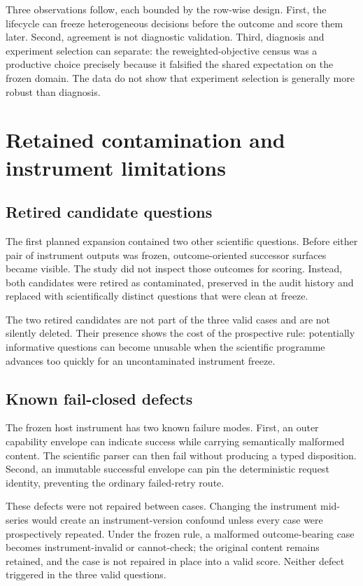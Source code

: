 \documentclass[10pt]{article}
\begin{document}
Three observations follow, each bounded by the row-wise design. First, the lifecycle can freeze heterogeneous decisions before the outcome and score them later. Second, agreement is not diagnostic validation. Third, diagnosis and experiment selection can separate: the reweighted-objective census was a productive choice precisely because it falsified the shared expectation on the frozen domain. The data do not show that experiment selection is generally more robust than diagnosis.

\section{Retained contamination and instrument limitations}

\subsection{Retired candidate questions}

The first planned expansion contained two other scientific questions. Before either pair of instrument outputs was frozen, outcome-oriented successor surfaces became visible. The study did not inspect those outcomes for scoring. Instead, both candidates were retired as contaminated, preserved in the audit history and replaced with scientifically distinct questions that were clean at freeze.

The two retired candidates are not part of the three valid cases and are not silently deleted. Their presence shows the cost of the prospective rule: potentially informative questions can become unusable when the scientific programme advances too quickly for an uncontaminated instrument freeze.

\subsection{Known fail-closed defects}

The frozen host instrument has two known failure modes. First, an outer capability envelope can indicate success while carrying semantically malformed content. The scientific parser can then fail without producing a typed disposition. Second, an immutable successful envelope can pin the deterministic request identity, preventing the ordinary failed-retry route.

These defects were not repaired between cases. Changing the instrument mid-series would create an instrument-version confound unless every case were prospectively repeated. Under the frozen rule, a malformed outcome-bearing case becomes instrument-invalid or cannot-check; the original content remains retained, and the case is not repaired in place into a valid score. Neither defect triggered in the three valid questions.
\end{document}
